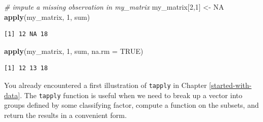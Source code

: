 \documentclass[
]{book}
\newenvironment{Shaded}{\begin{snugshade}}{\end{snugshade}}
\newcommand{\CommentTok}[1]{\textcolor[rgb]{0.56,0.35,0.01}{\textit{#1}}}
\newcommand{\DataTypeTok}[1]{\textcolor[rgb]{0.13,0.29,0.53}{#1}}
\newcommand{\DecValTok}[1]{\textcolor[rgb]{0.00,0.00,0.81}{#1}}
\newcommand{\KeywordTok}[1]{\textcolor[rgb]{0.13,0.29,0.53}{\textbf{#1}}}
\newcommand{\NormalTok}[1]{#1}
\newcommand{\OperatorTok}[1]{\textcolor[rgb]{0.81,0.36,0.00}{\textbf{#1}}}
\newcommand{\OtherTok}[1]{\textcolor[rgb]{0.56,0.35,0.01}{#1}}
\newcommand{\StringTok}[1]{\textcolor[rgb]{0.31,0.60,0.02}{#1}}
\begin{document}
\begin{Shaded}
\begin{Highlighting}[]
\CommentTok{# impute a missing observation in my_matrix}
\NormalTok{my_matrix[}\DecValTok{2}\NormalTok{,}\DecValTok{1}\NormalTok{] <-}\StringTok{ }\OtherTok{NA}
\KeywordTok{apply}\NormalTok{(my_matrix, }\DecValTok{1}\NormalTok{, sum)}
\end{Highlighting}
\end{Shaded}

\begin{verbatim}
[1] 12 NA 18
\end{verbatim}

\begin{Shaded}
\begin{Highlighting}[]
\KeywordTok{apply}\NormalTok{(my_matrix, }\DecValTok{1}\NormalTok{, sum, }\DataTypeTok{na.rm =} \OtherTok{TRUE}\NormalTok{)}
\end{Highlighting}
\end{Shaded}

\begin{verbatim}
[1] 12 13 18
\end{verbatim}

You already encountered a first illustration of \texttt{tapply} in Chapter \ref{started-with-data}. The \texttt{tapply} function is useful when we need to break up a vector into groups defined by some classifying factor, compute a function on the subsets, and return the results in a convenient form.

\begin{Shaded}
\end{Shaded}
\end{document}

